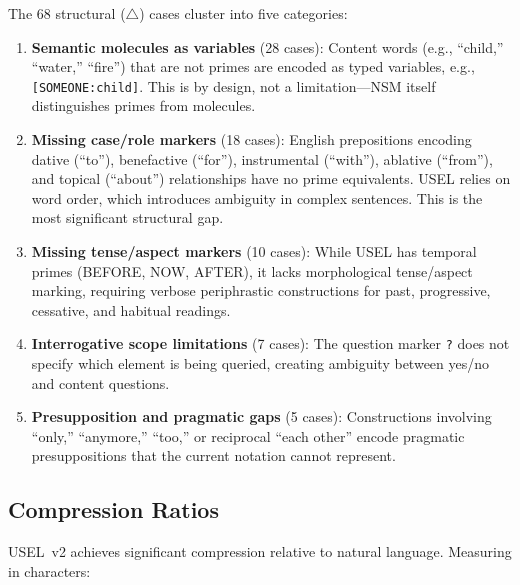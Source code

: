 \documentclass[11pt,a4paper]{article}
\newcommand{\uselprime}[1]{\texttt{[#1]}}
\begin{document}
The 68 structural ($\triangle$) cases cluster into five categories:

\begin{enumerate}[nosep]
    \item \textbf{Semantic molecules as variables} (28 cases): Content words (e.g., ``child,'' ``water,'' ``fire'') that are not primes are encoded as typed variables, e.g., \uselprime{SOMEONE:child}. This is by design, not a limitation---NSM itself distinguishes primes from molecules.

    \item \textbf{Missing case/role markers} (18 cases): English prepositions encoding dative (``to''), benefactive (``for''), instrumental (``with''), ablative (``from''), and topical (``about'') relationships have no prime equivalents. USEL relies on word order, which introduces ambiguity in complex sentences. This is the most significant structural gap.

    \item \textbf{Missing tense/aspect markers} (10 cases): While USEL has temporal primes (BEFORE, NOW, AFTER), it lacks morphological tense/aspect marking, requiring verbose periphrastic constructions for past, progressive, cessative, and habitual readings.

    \item \textbf{Interrogative scope limitations} (7 cases): The question marker \texttt{?} does not specify which element is being queried, creating ambiguity between yes/no and content questions.

    \item \textbf{Presupposition and pragmatic gaps} (5 cases): Constructions involving ``only,'' ``anymore,'' ``too,'' or reciprocal ``each other'' encode pragmatic presuppositions that the current notation cannot represent.
\end{enumerate}

\subsection{Compression Ratios}
\label{sec:compression}

USEL~v2 achieves significant compression relative to natural language. Measuring in characters:
\end{document}

